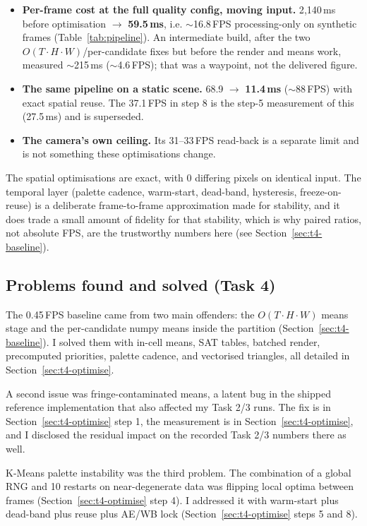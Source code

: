 \documentclass[11pt,a4paper]{article}
\begin{document}
\begin{itemize}
\item \textbf{Per-frame cost at the full quality config, moving input.}
  2{,}140\,ms before optimisation $\rightarrow$ \textbf{59.5\,ms}, i.e.
  $\sim$16.8\,FPS processing-only on synthetic frames
  (Table~\ref{tab:pipeline}). An intermediate build, after the two
  $O(T\cdot H\cdot W)$/per-candidate fixes but before the render and means work,
  measured $\sim$215\,ms ($\sim$4.6\,FPS); that was a waypoint, not the delivered
  figure.
\item \textbf{The same pipeline on a static scene.} 68.9 $\rightarrow$
  \textbf{11.4\,ms} ($\sim$88\,FPS) with exact spatial reuse. The 37.1\,FPS in
  step 8 is the step-5 measurement of this (27.5\,ms) and is superseded.
\item \textbf{The camera's own ceiling.} Its 31--33\,FPS read-back is a separate
  limit and is not something these optimisations change.
\end{itemize}

The spatial optimisations are exact, with 0 differing pixels on identical input.
The temporal layer (palette cadence, warm-start, dead-band, hysteresis,
freeze-on-reuse) is a deliberate frame-to-frame approximation made for stability,
and it does trade a small amount of fidelity for that stability, which is why
paired ratios, not absolute FPS, are the trustworthy numbers here (see
Section~\ref{sec:t4-baseline}).

\FloatBarrier
\FloatBarrier
\subsection{Problems found and solved (Task 4)}

The 0.45\,FPS baseline came from two main offenders: the
$O(T\cdot H\cdot W)$ means stage and the per-candidate numpy means inside the
partition (Section~\ref{sec:t4-baseline}). I solved them with in-cell means, SAT
tables, batched render, precomputed priorities, palette cadence, and vectorised
triangles, all detailed in Section~\ref{sec:t4-optimise}.

A second issue was fringe-contaminated means, a latent bug in the shipped
reference implementation that also affected my Task 2/3 runs. The fix is in
Section~\ref{sec:t4-optimise} step 1, the measurement is in
Section~\ref{sec:t4-optimise}, and I disclosed the residual impact on the
recorded Task 2/3 numbers there as well.

K-Means palette instability was the third problem. The combination of a global
RNG and 10 restarts on near-degenerate data was flipping local optima between
frames (Section~\ref{sec:t4-optimise} step 4). I addressed it with warm-start
plus dead-band plus reuse plus AE/WB lock (Section~\ref{sec:t4-optimise} steps 5
and 8).
\end{document}
